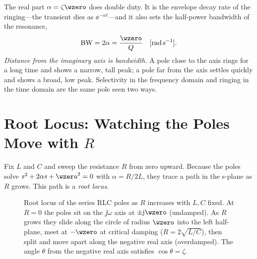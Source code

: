The real part \(\alpha=\zeta\wzero\) does double duty. It is the envelope decay
rate of the ringing---the transient dies as \(\ee^{-\alpha t}\)---and it also
sets the half-power bandwidth of the resonance,
\[
\text{BW}=2\alpha=\frac{\wzero}{Q}\quad[\si{\radian\per\second}].
\]
\emph{Distance from the imaginary axis is bandwidth.} A pole close to the axis
rings for a long time and shows a narrow, tall peak; a pole far from the axis
settles quickly and shows a broad, low peak. Selectivity in the frequency domain
and ringing in the time domain are the same pole seen two ways.

\section{Root Locus: Watching the Poles Move with \texorpdfstring{$R$}{R}}
Fix \(L\) and \(C\) and sweep the resistance \(R\) from zero upward. Because the
poles solve \(s^2+2\alpha s+\wzero^2=0\) with \(\alpha=R/2L\), they trace a path
in the s-plane as \(R\) grows. This path is a \emph{root locus}.

\begin{figure}[htbp]
\centering
{}
\caption{Root locus of the series RLC poles as \(R\) increases with \(L,C\)
fixed. At \(R=0\) the poles sit on the \(\jj\omega\) axis at \(\pm\jj\wzero\)
(undamped). As \(R\) grows they slide along the circle of radius \(\wzero\)
into the left half-plane, meet at \(-\wzero\) at critical damping
(\(R=2\sqrt{L/C}\)), then split and move apart along the negative real axis
(overdamped). The angle \(\theta\) from the negative real axis satisfies
\(\cos\theta=\zeta\).}
\label{fig:rlc-rootlocus}
\end{figure}

